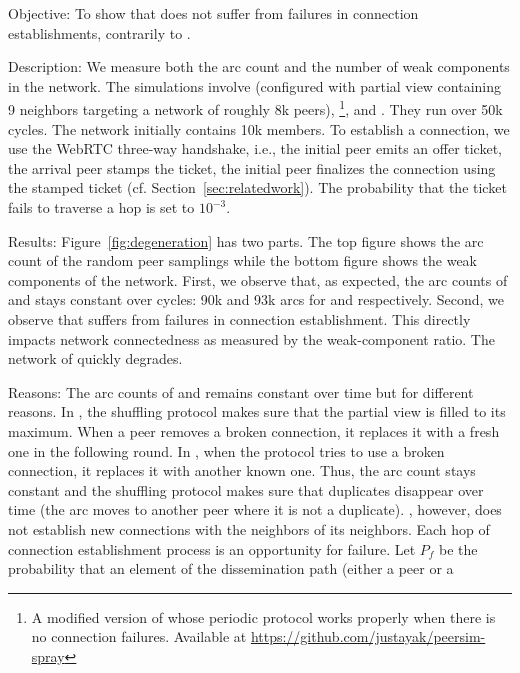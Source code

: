 \begin{asparadesc}
\item[Objective:] To show that \SPRAY does not suffer from failures in
  connection establishments, contrarily to \SCAMP.
\item[Description:] We measure both the arc count and the number of weak
  components in the network. The simulations involve \CYCLON (configured with
  partial view containing 9 neighbors targeting a network of roughly 8k
  peers), \SCAMP\footnote{A modified version of \SCAMP whose periodic protocol
    works properly when there is no connection failures. Available at
    \url{https://github.com/justayak/peersim-spray}}, and \SPRAY. They run over
  50k cycles. The network initially contains 10k members.  To establish a
  connection, we use the WebRTC three-way handshake, i.e., the initial peer
  emits an offer ticket, the arrival peer stamps the ticket, the initial peer
  finalizes the connection using the stamped ticket
  (cf. Section~\ref{sec:relatedwork}). The probability that the ticket fails to
  traverse a hop is set to $10^{-3}$.
\item[Results:] Figure~\ref{fig:degeneration} has two parts. The top
  figure shows the arc count of the random peer samplings while the
  bottom figure shows the weak components of the network.  First, we
  observe that, as expected, the arc counts of \CYCLON and \SPRAY
  stays constant over cycles: 90k and 93k arcs for \CYCLON and \SPRAY
  respectively. Second, we observe that \SCAMP suffers from failures
  in connection establishment. This directly impacts network
  connectedness as measured by the weak-component ratio. The network
  of \SCAMP quickly degrades.
\item[Reasons:] The arc counts of \CYCLON and \SPRAY remains constant
  over time but for different reasons. In \CYCLON, the shuffling
  protocol makes sure that the partial view is filled to its
  maximum. When a peer removes a broken connection, it replaces it
  with a fresh one in the following round.  In \SPRAY, when the
  protocol tries to use a broken connection, it replaces it with
  another known one. Thus, the arc count stays constant and the
  shuffling protocol makes sure that duplicates disappear over time
  (the arc moves to another peer where it is not a duplicate).
  \SCAMP, however, does not establish new connections with the
  neighbors of its neighbors.  Each hop of connection establishment
  process is an opportunity for failure.  Let $P_f$ be the probability
  that an element of the dissemination path (either a peer or a

\end{asparadesc}
